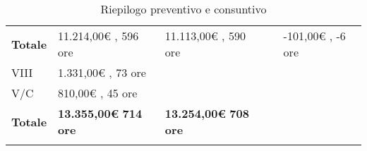 {\begin{longtable}{ C{1.5cm} | C{3.4cm} | C{3.4cm} | C{3cm} | C{3.4cm}}
   \color{white}\textbf{Totale} & \color{white}11.214,00€ , 596 ore & \color{white}11.113,00€ , 590 ore & & \color{white}-101,00€ , -6 ore\\
   
   VIII & 1.331,00€ , 73 ore &  &  & \\
   
   V/C & 810,00€ , 45 ore & &  & \\
   
   \textbf{Totale} & \textbf{13.355,00€} \newline \textbf{714 ore} & \textbf{13.254,00€} \newline \textbf{708 ore} &  &\\
   
   \caption{Riepilogo preventivo e consuntivo}
\end{longtable}
}

\newpage